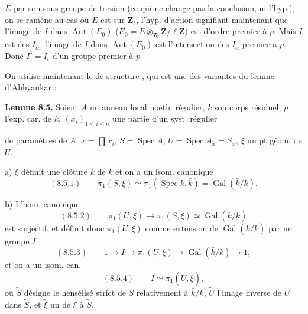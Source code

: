 \documentclass[11pt,a4paper]{article}
\begin{document}


 $E$ par son sous-groupe de torsion (ce qui ne change pas la conclusion, ni l'hyp.), on se ramène  au cas où $E$ est \ill{} sur $\mathbf{Z}_\ell$, l'hyp. d'action  signifiant maintenant que l'image de $I$ dans $\operatorname{Aut}(E_0)$ ($E_0 = E \otimes_{\mathbf{Z}_\ell} \mathbf{Z}/\ell\mathbf{Z}$) est d'ordre premier à $p$. Mais \ill{} \ill{} \ill{} $I$ est \ill{}  des \ill{} $I_\alpha$, \ill{} l'image de $I$ dans $\operatorname{Aut}(E_0)$ est \ill{} l'intersection des \ill{} \ill{} $I_\alpha$ \ill{} \ill{} \ill{} premier à $p$. Donc $I' = I_t$ \ill{} \ill{} d'un groupe \ill{} \ill{} \ill{} premier à $p$ \ill{}

 On utilise maintenant le \ill{} de structure , qui est une des variantes du lemme d'Abhyankar :


\textbf{Lemme 8.5.} Soient $A$ un anneau local noeth. régulier, $k$ son corps résiduel, $p$ l'exp. car. de $k$, $(x_i)_{1 \leq i \leq n}$ une partie d'un syst. régulier

de paramètres de $A$, $x = \prod x_i$, \struck{\ill{}} $S = \operatorname{Spec} A$, $U = \operatorname{Spec} A_x = S_x$, $\xi$ un pt géom. de $U$.

a) $\xi$ définit une clôture  $\bar k$ de $k$ et on a un isom. canonique
\[
(8.5.1) \qquad \pi_1(S,\xi) \simeq \pi_1(\operatorname{Spec} k, \bar k) = \operatorname{Gal}(\bar k/k).
\]

b) L'hom. canonique
\[
(8.5.2) \qquad \pi_1(U,\xi) \longrightarrow \pi_1(S,\xi) \simeq \operatorname{Gal}(\bar k/k)
\]
est surjectif, et définit donc $\pi_1(U,\xi)$ comme extension de $\operatorname{Gal}(\bar k/k)$ par un groupe $I$ ; 
\[
(8.5.3) \qquad 1 \longrightarrow I \longrightarrow \pi_1(U,\xi) \longrightarrow \operatorname{Gal}(\bar k/k) \longrightarrow 1 ,
\]
et on a un isom. can.
\[
(8.5.4) \qquad I \simeq \pi_1(\tilde U, \tilde\xi) ,
\]
où $\tilde S$ désigne le hensélisé strict de $S$ relativement à $\bar k/k$, \struck{\ill{}} $\tilde U$ l'image inverse de $U$ dans $\tilde S$, et $\tilde\xi$ un \ill{} de $\xi$ à $\tilde S$.
\end{document}
